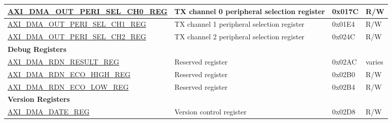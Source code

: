 \begin{longtable}{ | l | p{10cm} | p{1.3cm} | l | }
\hyperref[regdesc:AXIDMAOUTPERISELCHNREG]{AXI\_DMA\_OUT\_PERI\_SEL\_CH0\_REG} & TX channel 0 peripheral selection register & 0x017C & R/W \\ \hline
\hyperref[regdesc:AXIDMAOUTPERISELCHNREG]{AXI\_DMA\_OUT\_PERI\_SEL\_CH1\_REG} & TX channel 1 peripheral selection register & 0x01E4 & R/W \\ \hline
\hyperref[regdesc:AXIDMAOUTPERISELCHNREG]{AXI\_DMA\_OUT\_PERI\_SEL\_CH2\_REG} & TX channel 2 peripheral selection register & 0x024C & R/W \\ \hline
\multicolumn{4}{|l|}{\textbf{Debug Registers}} \\ \hline
\hyperref[regdesc:AXIDMARDNRESULTREG]{AXI\_DMA\_RDN\_RESULT\_REG} & Reserved register & 0x02AC & varies \\ \hline
\hyperref[regdesc:AXIDMARDNECOHIGHREG]{AXI\_DMA\_RDN\_ECO\_HIGH\_REG} & Reserved register & 0x02B0 & R/W \\ \hline
\hyperref[regdesc:AXIDMARDNECOLOWREG]{AXI\_DMA\_RDN\_ECO\_LOW\_REG} & Reserved register & 0x02B4 & R/W \\ \hline
\multicolumn{4}{|l|}{\textbf{Version Registers}} \\ \hline
\hyperref[regdesc:AXIDMADATEREG]{AXI\_DMA\_DATE\_REG} & Version control register & 0x02D8 & R/W \\ \hline
\end{longtable}
